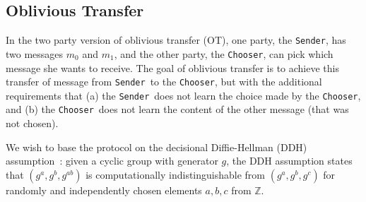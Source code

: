 \documentclass[preprint]{sig-alternate-05-2015}
\def\sender{{\tt{Sender}}}
\def\chooser{{\tt{Chooser}}}
\begin{document}
\subsection{Oblivious Transfer}

In the two party version of oblivious transfer (OT), 
one party, the \sender, has two messages $m_0$ and $m_1$,
and the other party, the \chooser, can pick which message she wants to receive.
The goal of oblivious transfer is to achieve this transfer of
message from \sender\ to the \chooser, but with the additional
requirements that
(a) the \sender\ does not learn the choice made by the \chooser,
and
(b) the \chooser\ does not learn the content of the other message 
(that was not chosen).

We wish to base the protocol on the decisional Diffie-Hellman (DDH) assumption~\cite{Boneh:DDH}:
given a cyclic group with generator $g$, the DDH assumption states that
$(g^a,g^b,g^{ab})$ is computationally indistinguishable from
$(g^a,g^b,g^c)$ for randomly and independently chosen elements $a,b,c$ from $\mathbb{Z}$.

\end{document}

